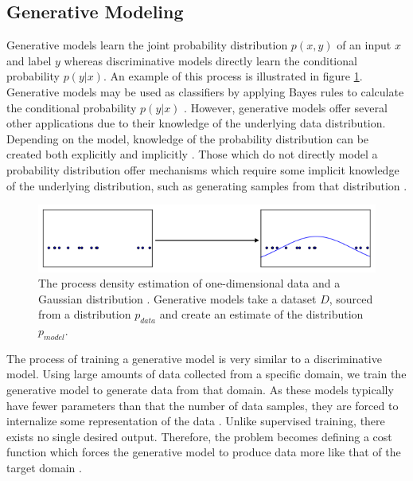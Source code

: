 \documentclass[11pt]{article}
\begin{document}
\subsection{Generative Modeling}
Generative models learn the joint probability distribution $p(x,y)$ of an input $x$ and label $y$ whereas discriminative models directly learn the conditional probability $p(y|x)$. An example of this process is illustrated in figure \ref{fig:pdf}. Generative models may be used as classifiers by applying Bayes rules to calculate the conditional probability $p(y|x)$ \citep{NIPS2001_2020}. However, generative models offer several other applications due to their knowledge of the underlying data distribution. Depending on the model, knowledge of the probability distribution can be created both explicitly and implicitly \citep{Goodfellow-et-al-2016}. Those which do not directly model a probability distribution offer mechanisms which require some implicit knowledge of the underlying distribution, such as generating samples from that distribution \citep{Goodfellow-et-al-2016}.

\begin{figure}
\centering
\includegraphics[scale=0.7]{pdf}
\caption{The process density estimation of one-dimensional data and a Gaussian distribution \citep{2017arXiv170100160G}. Generative models take a dataset $D$, sourced from a distribution $p_{data}$ and create an estimate of the distribution $p_{model}$.}
\label{fig:pdf}
\end{figure}

The process of training a generative model is very similar to a discriminative model. Using large amounts of data collected from a specific domain, we train the generative model to generate data from that domain. As these models typically have fewer parameters than that the number of data samples, they are forced to internalize some representation of the data \citep{genmodelingopenai}. Unlike supervised training, there exists no single desired output. Therefore, the problem becomes defining a cost function which forces the generative model to produce data more like that of the target domain \citep{genmodelingopenai}.
\end{document}
